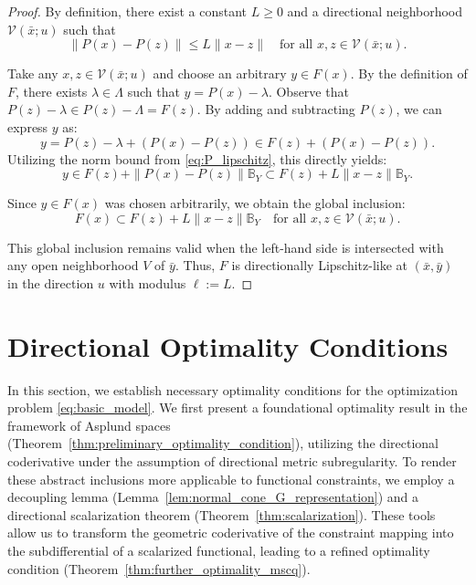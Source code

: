 \documentclass[12pt,twoside,reqno]{amsart}
\theoremstyle{definition}
\numberwithin{equation}{section}
\begin{document}
\begin{proof}
By definition, there exist a constant $L \ge 0$ and a directional neighborhood $\mathcal{V}(\bar{x}; u)$ such that
    \begin{equation} \label{eq:P_lipschitz}
        \|P(x) - P(z)\| \le L \|x - z\| \quad \text{for all } x, z \in \mathcal{V}(\bar{x}; u).
    \end{equation}
    
    Take any $x, z \in \mathcal{V}(\bar{x}; u)$ and choose an arbitrary $y \in F(x)$. By the definition of $F$, there exists $\lambda \in \Lambda$ such that $y = P(x) - \lambda$. Observe that $P(z) - \lambda \in P(z) - \Lambda = F(z)$. By adding and subtracting $P(z)$, we can express $y$ as:
    \begin{equation*}
        y = P(z) - \lambda + (P(x) - P(z)) \in F(z) + (P(x) - P(z)).
    \end{equation*}
    Utilizing the norm bound from \eqref{eq:P_lipschitz}, this directly yields:
    \begin{equation*}
        y \in F(z) + \|P(x) - P(z)\| \mathbb{B}_Y \subset F(z) + L \|x - z\| \mathbb{B}_Y.
    \end{equation*}
    
    Since $y \in F(x)$ was chosen arbitrarily, we obtain the global inclusion:
    \begin{equation*}
        F(x) \subset F(z) + L \|x - z\| \mathbb{B}_Y \quad \text{for all } x, z \in \mathcal{V}(\bar{x}; u).
    \end{equation*}
    
    This global inclusion remains valid when the left-hand side is intersected with any open neighborhood $V$ of $\bar{y}$. Thus, $F$ is directionally Lipschitz-like at $(\bar{x}, \bar{y})$ in the direction $u$ with modulus $\ell := L$. 
\end{proof}

\section{Directional Optimality Conditions}\label{sec:optimality_condition}

In this section, we establish necessary optimality conditions for the optimization problem \eqref{eq:basic_model}. We first present a foundational optimality result in the framework of Asplund spaces (Theorem~\ref{thm:preliminary_optimality_condition}), utilizing the directional coderivative under the assumption of directional metric subregularity. To render these abstract inclusions more applicable to functional constraints, we employ a decoupling lemma (Lemma~\ref{lem:normal_cone_G_representation}) and a directional scalarization theorem (Theorem~\ref{thm:scalarization}). These tools allow us to transform the geometric coderivative of the constraint mapping into the subdifferential of a scalarized functional, leading to a refined optimality condition (Theorem~\ref{thm:further_optimality_mscq}). 
\end{document}
